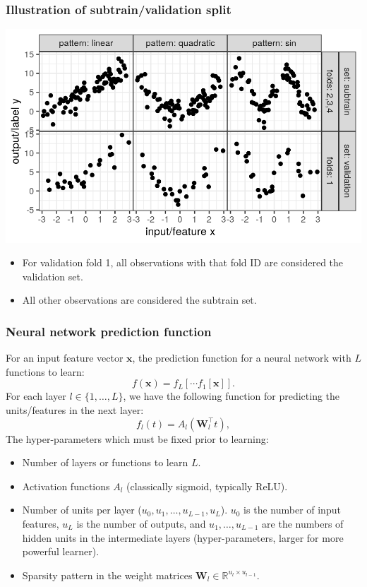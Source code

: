 \documentclass{beamer}
\begin{document}
\begin{frame}
  \frametitle{Illustration of subtrain/validation split}
  \includegraphics[width=\textwidth]{figure-overfitting-data-sets}

  \begin{itemize}
  \item For validation fold 1, all observations with that fold ID are
    considered the validation set.
  \item All other observations are considered the subtrain set.
  \end{itemize}
\end{frame}

 

\begin{frame}
  \frametitle{Neural network prediction function} For an input feature
  vector $\mathbf x$, the prediction function for a neural network
  with $L$ functions to learn:
\begin{equation}
  f(\mathbf x) = f_L[\cdots f_1[\mathbf x] ].
\end{equation}
For each layer $l\in\{1,\dots,L\}$, we have the following function for
predicting the units/features in the next layer:
\begin{equation}
  f_l(t) = A_l( \mathbf W_l^\intercal t ),
\end{equation}
The hyper-parameters which must be fixed prior to learning:
\begin{itemize}
\item Number of layers or functions to learn $L$.
\item Activation functions $A_l$ (classically sigmoid, typically ReLU).
\item Number of units per layer ($u_0,
  u_1,\dots,u_{L-1},u_L$). $u_0$ is the number of input features,
  $u_L$ is the number of outputs, and $u_1,\dots,u_{L-1}$ are the
  numbers of hidden units in the intermediate layers
  (hyper-parameters, larger for more powerful learner).
\item Sparsity pattern in the weight matrices $\mathbf W_l\in\mathbb R^{u_{l}\times u_{l-1}}$.
\end{itemize}
\end{frame}
\end{document}
